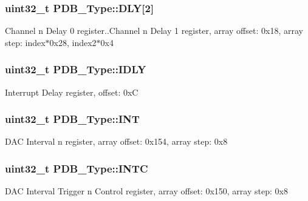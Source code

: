\subsubsection[{\texorpdfstring{D\+LY}{DLY}}]{ uint32\+\_\+t P\+D\+B\+\_\+\+Type\+::\+D\+LY\mbox{[}2\mbox{]}}\hypertarget{structPDB__Type_a313f3125147793d214f81d5bb45f04c3}{}\label{structPDB__Type_a313f3125147793d214f81d5bb45f04c3}
Channel n Delay 0 register..Channel n Delay 1 register, array offset\+: 0x18, array step\+: index$\ast$0x28, index2$\ast$0x4 
\subsubsection[{\texorpdfstring{I\+D\+LY}{IDLY}}]{ uint32\+\_\+t P\+D\+B\+\_\+\+Type\+::\+I\+D\+LY}\hypertarget{structPDB__Type_a0cc0a5fd26a50498ff744ccfc90425a9}{}\label{structPDB__Type_a0cc0a5fd26a50498ff744ccfc90425a9}
Interrupt Delay register, offset\+: 0xC 
\subsubsection[{\texorpdfstring{I\+NT}{INT}}]{ uint32\+\_\+t P\+D\+B\+\_\+\+Type\+::\+I\+NT}\hypertarget{structPDB__Type_ae769221841ab03c4c16643108c5f5a0c}{}\label{structPDB__Type_ae769221841ab03c4c16643108c5f5a0c}
D\+AC Interval n register, array offset\+: 0x154, array step\+: 0x8 
\subsubsection[{\texorpdfstring{I\+N\+TC}{INTC}}]{ uint32\+\_\+t P\+D\+B\+\_\+\+Type\+::\+I\+N\+TC}\hypertarget{structPDB__Type_a7243b34a966694845cbbd4f5c614e986}{}\label{structPDB__Type_a7243b34a966694845cbbd4f5c614e986}
D\+AC Interval Trigger n Control register, array offset\+: 0x150, array step\+: 0x8 
